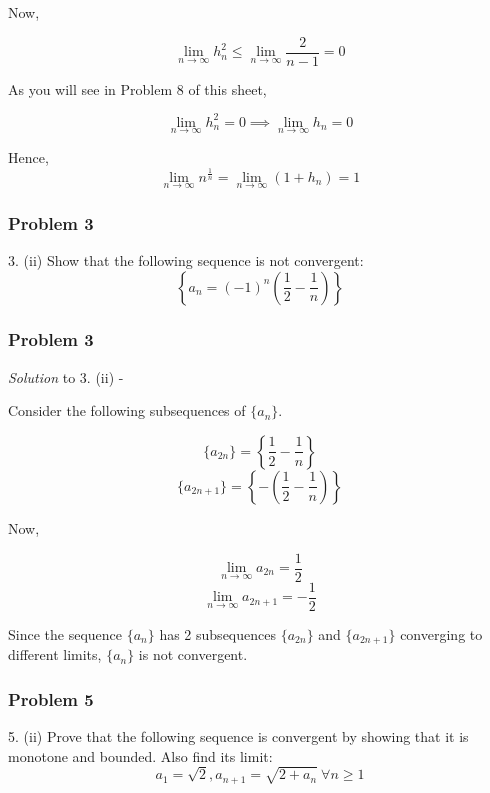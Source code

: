 \documentclass[
	11pt, %
]{beamer}
\begin{document}
\begin{frame}[t]
	Now,

	\[ \lim_{n \to \infty} h_n^2 \leq \lim_{n \to \infty} \frac{2}{n-1} = 0 \]

	\medskip

	As you will see in Problem 8 of this sheet,

	\[\lim_{n \to \infty} h_n^2 = 0 \implies \lim_{n \to \infty} h_n = 0\]

	Hence,
	\[\lim_{n \to \infty} n^\frac1n = \lim_{n \to \infty} (1+h_n) = 1\]

\end{frame}

\begin{frame}
	\frametitle{Problem 3}
	
	\begin{block}{3. (ii)}
		Show that the following sequence is not convergent:
		\[ \left \{ a_n = (-1)^n \left ( \frac12 - \frac1n \right )\right \} \]
	\end{block}
	
\end{frame}

\begin{frame}[t]
	\frametitle{Problem 3}

	\textit{Solution} to 3. (ii) -

	\bigskip

	Consider the following subsequences of $\{a_n\}$.

	\[\{a_{2n}\} = \left \{ \frac12 - \frac1n \right \}\]
	\[\{a_{2n+1}\} = \left \{ - \left (\frac12 - \frac1n \right ) \right \}\]

	Now,

	\[\lim_{n \to \infty} a_{2n} = \frac12\]
	\[\lim_{n \to \infty} a_{2n+1} = - \frac12\]

	Since the sequence $\{a_n\}$ has 2 subsequences $\{a_{2n}\}$ and $\{a_{2n+1}\}$ converging to different limits, $\{a_n\}$ is not convergent.
\end{frame}

\begin{frame}
	\frametitle{Problem 5}
	
	\begin{block}{5. (ii)}
		Prove that the following sequence is convergent by showing that it is monotone and bounded. Also find its limit:
		\[ a_1 = \sqrt2, a_{n+1} = \sqrt{2 + a_n} ~ \forall n \geq 1\]
	\end{block}
	
\end{frame}
\end{document}
